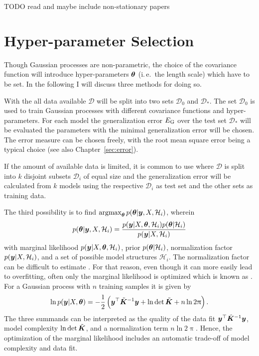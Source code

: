 TODO read and maybe include non-stationary papers

\section{Hyper-parameter Selection}
Though Gaussian processes are non-parametric, the choice of the covariance 
function will introduce hyper-parameters $\bm{\theta}$ (i.\,e.~the length scale) 
which have to be set.  In the following I will discuss three methods for doing 
so.

With the  all data available $\mathcal{D}$ will be 
split into two sets $\mathcal{D}_0$ and $\mathcal{D}_*$. The set $\mathcal{D}_0$ 
is used to train Gaussian processes with different covariance functions and 
hyper-parameters. For each model the generalization error $E_{\mathrm{G}}$ over the 
test set $\mathcal{D}_*$ will be evaluated the parameters with the minimal 
generalization error will be chosen. The error measure can be chosen freely, 
with the root mean square error being a typical choice (see also 
Chapter~\ref{sec:error}).

If the amount of available data is limited, it is common to use 
 where $\mathcal{D}$ is split into $k$ 
disjoint subsets $\mathcal{D}_i$ of equal size and the generalization error will 
be calculated from $k$ models using the respective $\mathcal{D}_i$ as test set 
and the other sets as training data.

The third possibility is to find $\operatorname*{argmax}_{\bm{\theta}} p(\bm{\theta} | \bm{y}, X, 
\mathcal{H}_i)$, wherein
\begin{equation}
    p(\bm{\theta} | \bm{y}, X, \mathcal{H}_i) = \frac{p(\bm{y} | X, \bm{\theta}, 
        \mathcal{H}_i) p(\bm{\theta} | \mathcal{H}_i)}{p(\bm{y} | X, 
        \mathcal{H}_i)}
\end{equation}
with marginal likelihood $p(\bm{y} | X, \bm{\theta}, \mathcal{H}_i)$, prior 
$p(\bm{\theta} | \mathcal{H}_i)$, normalization factor $p(\bm{y} | X, 
\mathcal{H}_i)$, and a set of possible model structures $\mathcal{H}_i$. The 
normalization factor can be difficult to estimate 
\parencite[109]{Rasmussen:2006vz}. For that reason, even though it can more 
easily lead to overfitting, often only the marginal likelihood is optimized 
which is known as . For a Gaussian 
process with $n$ training samples it is given by
\begin{equation}
    \ln p(\vc y | X, \vc\theta) = -\frac{1}{2}\del{\vc y\Tr \tilde{\mat{K}}^{-1} 
        \vc y + \ln \det \tilde{\mat K} + n \ln 2\uppi} \text{.}
\end{equation}
The three summands can be interpreted as the quality of the data fit $\bm{y}^{\top} 
\tilde{\bm{K}}^{-1} \bm{y}$, model complexity $\ln \det \tilde{\bm{K}}$, and 
a normalization term $n \ln 2\uppi$. Hence, the optimization of the marginal 
likelihood includes an automatic trade-off of model complexity and data fit.

